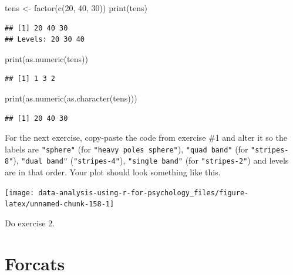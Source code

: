 \documentclass[
]{book}
\newenvironment{Shaded}{\begin{snugshade}}{\end{snugshade}}
\newcommand{\DecValTok}[1]{\textcolor[rgb]{0.00,0.00,0.81}{#1}}
\newcommand{\FunctionTok}[1]{\textcolor[rgb]{0.00,0.00,0.00}{#1}}
\newcommand{\NormalTok}[1]{#1}
\newcommand{\OtherTok}[1]{\textcolor[rgb]{0.56,0.35,0.01}{#1}}
\begin{document}
\begin{Shaded}
\begin{Highlighting}[]
\NormalTok{tens }\OtherTok{\textless{}{-}} \FunctionTok{factor}\NormalTok{(}\FunctionTok{c}\NormalTok{(}\DecValTok{20}\NormalTok{, }\DecValTok{40}\NormalTok{, }\DecValTok{30}\NormalTok{))}
\FunctionTok{print}\NormalTok{(tens)}
\end{Highlighting}
\end{Shaded}

\begin{verbatim}
## [1] 20 40 30
## Levels: 20 30 40
\end{verbatim}

\begin{Shaded}
\begin{Highlighting}[]
\FunctionTok{print}\NormalTok{(}\FunctionTok{as.numeric}\NormalTok{(tens))}
\end{Highlighting}
\end{Shaded}

\begin{verbatim}
## [1] 1 3 2
\end{verbatim}

\begin{Shaded}
\begin{Highlighting}[]
\FunctionTok{print}\NormalTok{(}\FunctionTok{as.numeric}\NormalTok{(}\FunctionTok{as.character}\NormalTok{(tens)))}
\end{Highlighting}
\end{Shaded}

\begin{verbatim}
## [1] 20 40 30
\end{verbatim}

For the next exercise, copy-paste the code from exercise \#1 and alter it so the labels are \texttt{"sphere"} (for \texttt{"heavy\ poles\ sphere"}), \texttt{"quad\ band"} (for \texttt{"stripes-8"}), \texttt{"dual\ band"} (\texttt{"stripes-4"}), \texttt{"single\ band"} (for \texttt{"stripes-2"}) and levels are in that order. Your plot should look something like this.

\begin{center}\texttt{[image: data-analysis-using-r-for-psychology\_files/figure-latex/unnamed-chunk-158-1]} \end{center}

Do exercise 2.

\hypertarget{forcats}{%
\section{Forcats}\label{forcats}}
\end{document}
